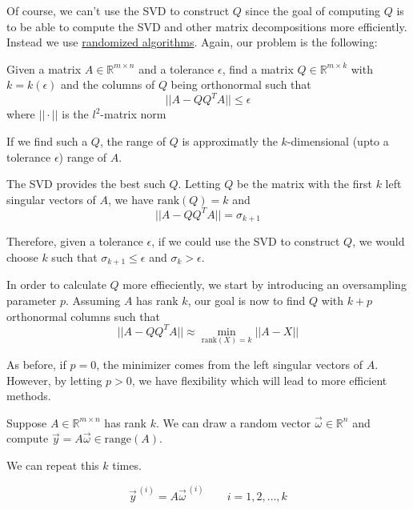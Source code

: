 
Of course, we can't use the SVD to construct $Q$ since the goal of computing $Q$ is to be able to compute the SVD and other matrix decompositions more efficiently. Instead we use \underline{randomized algorithms}. Again, our problem is the following:

\begin{displayquote}
Given a matrix $A \in \mathbb{R}^{m\times n}$ and a tolerance $\epsilon$, find a matrix $Q \in \mathbb{R}^{m\times k}$ with $k=k(\epsilon)$ and the columns of $Q$ being orthonormal such that
\begin{equation*}
    || A - QQ^TA || \leq \epsilon
\end{equation*}
where $||\cdot ||$ is the $l^2$-matrix norm
\end{displayquote}

If we find such a $Q$, the range of $Q$ is approximatly the $k$-dimensional (upto a tolerance $\epsilon$) range of $A$.

The SVD provides the best such $Q$. Letting $Q$ be the matrix with the first $k$ left singular vectors of $A$, we have $\text{rank}(Q)=k$ and
\begin{equation*}
    || A - QQ^TA || = \sigma_{k+1}
\end{equation*}

Therefore, given a tolerance $\epsilon$, if we could use the SVD to construct $Q$, we would choose $k$ such that $\sigma_{k+1} \leq \epsilon$ and $\sigma_k > \epsilon$.

In order to calculate $Q$ more effieciently, we start by introducing an oversampling parameter $p$. Assuming $A$ has rank $k$, our goal is now to find $Q$ with $k+p$ orthonormal columns such that
\begin{equation*}
    || A - QQ^TA || \approx \min_{\text{rank}(X)=k} || A- X||
\end{equation*}

As before, if $p=0$, the minimizer comes from the left singular vectors of $A$. However, by letting $p>0$, we have flexibility which will lead to more efficient methods.


Suppose $A \in \mathbb{R}^{m\times n}$ has rank $k$. We can draw a random vector $\vec{\omega} \in \mathbb{R}^n$ and compute $\vec{y} = A \vec{\omega} \in \text{range}(A)$.

We can repeat this $k$ times.

\begin{equation*}
    \vec{y}^{\,(i)} = A \vec{\omega}^{\,(i)} \qquad i = 1, 2, \ldots, k
\end{equation*}

